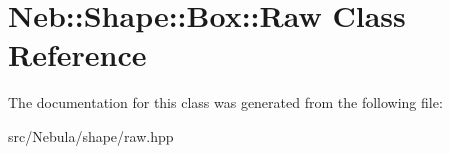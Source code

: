 \hypertarget{classNeb_1_1Shape_1_1Box_1_1Raw}{\section{\-Neb\-:\-:\-Shape\-:\-:\-Box\-:\-:\-Raw \-Class \-Reference}
\label{classNeb_1_1Shape_1_1Box_1_1Raw}
}


\-The documentation for this class was generated from the following file\-:\begin{DoxyCompactItemize}
\item 
src/\-Nebula/shape/raw.\-hpp\end{DoxyCompactItemize}

